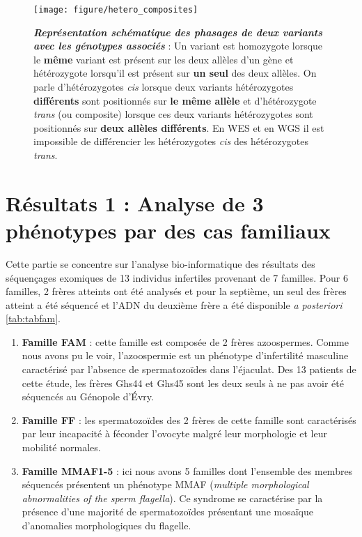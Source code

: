 \documentclass[12pt,a4paper,twoside]{ugathesis}
\theoremstyle{definition}
\theoremstyle{definition}
\theoremstyle{definition}
\theoremstyle{remark}
\begin{document}
\begin{figure}

{\centering \texttt{[image: figure/hetero\_composites]} 

}

\caption[Représentation schématique des phasages de deux variants avec les génotypes associés]{\textbf{\emph{Représentation schématique des
phasages de deux variants avec les génotypes associés}} : Un variant est
homozygote lorsque le \textbf{même} variant est présent sur les deux
allèles d'un gène et hétérozygote lorsqu'il est présent sur \textbf{un
seul} des deux allèles. On parle d'hétérozygotes \emph{cis} lorsque deux
variants hétérozygotes \textbf{différents} sont positionnés sur
\textbf{le même allèle} et d'hétérozygote \emph{trans} (ou composite)
lorsque ces deux variants hétérozygotes sont positionnés sur
\textbf{deux allèles différents}. En WES et en WGS il est impossible de
différencier les hétérozygotes \emph{cis} des hétérozygotes
\emph{trans}.}\label{fig:piccompositehet}
\end{figure}













\newpage

\section{Résultats 1 : Analyse de 3 phénotypes par des cas
familiaux}\label{resultats-1-analyse-de-3-phenotypes-par-des-cas-familiaux}

Cette partie se concentre sur l'analyse bio-informatique des résultats
des séquençages exomiques de 13 individus infertiles provenant de 7
familles. Pour 6 familles, 2 frères atteints ont été analysés et pour la
septième, un seul des frères atteint a été séquencé et l'ADN du deuxième
frère a été disponible \emph{a posteriori} \ref{tab:tabfam}.

\begin{enumerate}
\def\labelenumi{\arabic{enumi}.}
\item
  \textbf{Famille FAM} : cette famille est composée de 2 frères
  azoospermes. Comme nous avons pu le voir, l'azoospermie est un
  phénotype d'infertilité masculine caractérisé par l'absence de
  spermatozoïdes dans l'éjaculat. Des 13 patients de cette étude, les
  frères Ghs44 et Ghs45 sont les deux seuls à ne pas avoir été séquencés
  au Génopole d'Évry.
\item
  \textbf{Famille FF} : les spermatozoïdes des 2 frères de cette famille
  sont caractérisés par leur incapacité à féconder l'ovocyte malgré leur
  morphologie et leur mobilité normales.
\item
  \textbf{Famille MMAF1-5} : ici nous avons 5 familles dont l'ensemble
  des membres séquencés présentent un phénotype MMAF (\emph{multiple
  morphological abnormalities of the sperm flagella}). Ce syndrome se
  caractérise par la présence d'une majorité de spermatozoïdes
  présentant une mosaïque d'anomalies morphologiques du flagelle.
\end{enumerate}
\end{document}
